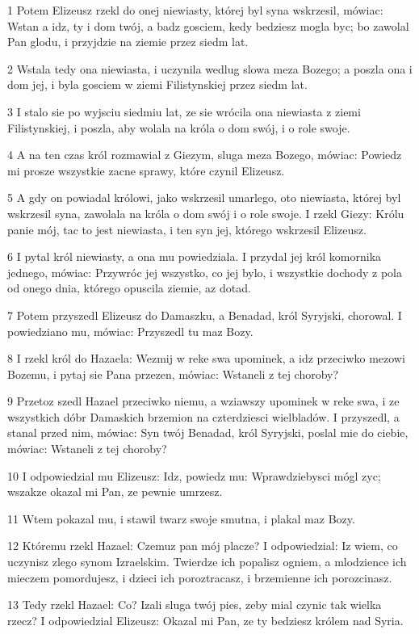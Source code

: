 \par 1 Potem Elizeusz rzekl do onej niewiasty, której byl syna wskrzesil, mówiac: Wstan a idz, ty i dom twój, a badz gosciem, kedy bedziesz mogla byc; bo zawolal Pan glodu, i przyjdzie na ziemie przez siedm lat.
\par 2 Wstala tedy ona niewiasta, i uczynila wedlug slowa meza Bozego; a poszla ona i dom jej, i byla gosciem w ziemi Filistynskiej przez siedm lat.
\par 3 I stalo sie po wyjsciu siedmiu lat, ze sie wrócila ona niewiasta z ziemi Filistynskiej, i poszla, aby wolala na króla o dom swój, i o role swoje.
\par 4 A na ten czas król rozmawial z Giezym, sluga meza Bozego, mówiac: Powiedz mi prosze wszystkie zacne sprawy, które czynil Elizeusz.
\par 5 A gdy on powiadal królowi, jako wskrzesil umarlego, oto niewiasta, której byl wskrzesil syna, zawolala na króla o dom swój i o role swoje. I rzekl Giezy: Królu panie mój, tac to jest niewiasta, i ten syn jej, którego wskrzesil Elizeusz.
\par 6 I pytal król niewiasty, a ona mu powiedziala. I przydal jej król komornika jednego, mówiac: Przywróc jej wszystko, co jej bylo, i wszystkie dochody z pola od onego dnia, którego opuscila ziemie, az dotad.
\par 7 Potem przyszedl Elizeusz do Damaszku, a Benadad, król Syryjski, chorowal. I powiedziano mu, mówiac: Przyszedl tu maz Bozy.
\par 8 I rzekl król do Hazaela: Wezmij w reke swa upominek, a idz przeciwko mezowi Bozemu, i pytaj sie Pana przezen, mówiac: Wstaneli z tej choroby?
\par 9 Przetoz szedl Hazael przeciwko niemu, a wziawszy upominek w reke swa, i ze wszystkich dóbr Damaskich brzemion na czterdziesci wielbladów. I przyszedl, a stanal przed nim, mówiac: Syn twój Benadad, król Syryjski, poslal mie do ciebie, mówiac: Wstaneli z tej choroby?
\par 10 I odpowiedzial mu Elizeusz: Idz, powiedz mu: Wprawdziebysci mógl zyc; wszakze okazal mi Pan, ze pewnie umrzesz.
\par 11 Wtem pokazal mu, i stawil twarz swoje smutna, i plakal maz Bozy.
\par 12 Któremu rzekl Hazael: Czemuz pan mój placze? I odpowiedzial: Iz wiem, co uczynisz zlego synom Izraelskim. Twierdze ich popalisz ogniem, a mlodzience ich mieczem pomordujesz, i dzieci ich poroztracasz, i brzemienne ich porozcinasz.
\par 13 Tedy rzekl Hazael: Co? Izali sluga twój pies, zeby mial czynic tak wielka rzecz? I odpowiedzial Elizeusz: Okazal mi Pan, ze ty bedziesz królem nad Syria.
